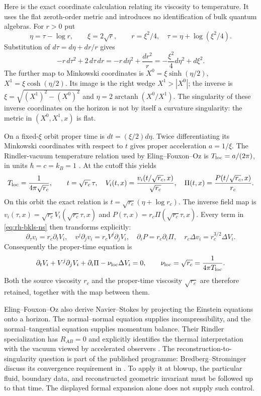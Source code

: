 Here is the exact coordinate calculation relating its viscosity to temperature.
It uses the flat zeroth-order metric and introduces no identification of bulk
quantum algebras. For $r>0$ put
\[
 \eta=\tau-\log r,\qquad \xi=2\sqrt r,
 \qquad r=\xi^2/4,\quad \tau=\eta+\log(\xi^2/4).
\]
Substitution of $d\tau=d\eta+dr/r$ gives
\begin{equation}
 -r\,d\tau^2+2\,d\tau\,dr
 =-r\,d\eta^2+\frac{dr^2}{r}
 =-\frac{\xi^2}{4}d\eta^2+d\xi^2.
 \label{eq:rh-rindler-coordinates}
\end{equation}
The further map to Minkowski coordinates is
$X^0=\xi\sinh(\eta/2)$, $X^1=\xi\cosh(\eta/2)$.
Its image is the right wedge $X^1>|X^0|$; the inverse is
$\xi=\sqrt{(X^1)^2-(X^0)^2}$ and
$\eta=2\operatorname{arctanh}(X^0/X^1)$.
The singularity of these inverse coordinates on the horizon is not by itself
a curvature singularity: the metric in $(X^0,X^1,x)$ is flat.

On a fixed-$\xi$ orbit proper time is $dt=(\xi/2)d\eta$.
Twice differentiating its Minkowski coordinates with respect to $t$ gives
proper acceleration $a=1/\xi$. The Rindler-vacuum temperature relation used by
Eling--Fouxon--Oz is $T_{\rm loc}=a/(2\pi)$, in units
$\hbar=c=k_B=1$ \cite[(32)--(33) and following discussion]{efo2009}.
At the cutoff this yields
\begin{equation}
 T_{\rm loc}=\frac{1}{4\pi\sqrt{r_c}},\qquad
 t=\sqrt{r_c}\,\tau,\quad
 V_i(t,x)=\frac{v_i(t/\sqrt{r_c},x)}{\sqrt{r_c}},\quad
 \Pi(t,x)=\frac{P(t/\sqrt{r_c},x)}{r_c}.
 \label{eq:rh-local-temperature-map}
\end{equation}
On this orbit the exact relation is
$t=\sqrt{r_c}(\eta+\log r_c)$.
The inverse field map is
$v_i(\tau,x)=\sqrt{r_c}V_i(\sqrt{r_c}\tau,x)$ and
$P(\tau,x)=r_c\Pi(\sqrt{r_c}\tau,x)$.
Every term in \eqref{eq:rh-bkls-ns} then transforms explicitly:
\[
 \partial_\tau v_i=r_c\partial_tV_i,\quad
 v^j\partial_jv_i=r_cV^j\partial_jV_i,\quad
 \partial_iP=r_c\partial_i\Pi,\quad
 r_c\Delta v_i=r_c^{3/2}\Delta V_i.
\]
Consequently the proper-time equation is
\begin{equation}
 \partial_tV_i+V^j\partial_jV_i+\partial_i\Pi
   -\nu_{\rm loc}\Delta V_i=0,\qquad
 \nu_{\rm loc}=\sqrt{r_c}=\frac1{4\pi T_{\rm loc}}.
 \label{eq:rh-viscosity-temperature}
\end{equation}
Both the source viscosity $r_c$ and the proper-time viscosity $\sqrt{r_c}$
are therefore retained, together with the map between them.

Eling--Fouxon--Oz also derive Navier--Stokes by projecting the Einstein
equations onto a horizon. The normal--normal equation supplies
incompressibility, and the normal--tangential equation supplies momentum
balance. Their Rindler specialization has $R_{AB}=0$ and explicitly identifies
the thermal interpretation with the vacuum viewed by accelerated observers
\cite[(21)--(25), (32)--(33)]{efo2009}.
The reconstruction-to-singularity question is part of the published programme:
Bredberg--Strominger discuss its convergence requirement in
\cite[\S5]{bs2011}. To apply it at blowup, the particular fluid, boundary data,
and reconstructed geometric invariant must be followed up to that time.
The displayed formal expansion alone does not supply such control.

